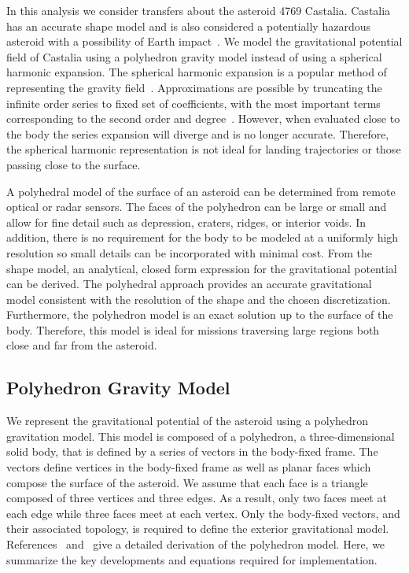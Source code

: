 \documentclass[]{aiaa-tc}%
\begin{document}
In this analysis we consider transfers about the asteroid 4769 Castalia.
Castalia has an accurate shape model and is also considered a potentially hazardous asteroid with a possibility of Earth impact~\cite{hudson1994}.
We model the gravitational potential field of Castalia using a polyhedron gravity model instead of using a spherical harmonic expansion.
The spherical harmonic expansion is a popular method of representing the gravity field~\cite{scheeres1996}.
Approximations are possible by truncating the infinite order series to fixed set of coefficients, with the most important terms corresponding to the second order and degree~\cite{scheeres1994}. 
However, when evaluated close to the body the series expansion will diverge and is no longer accurate. 
Therefore, the spherical harmonic representation is not ideal for landing trajectories or those passing close to the surface.

A polyhedral model of the surface of an asteroid can be determined from remote optical or radar sensors.
The faces of the polyhedron can be large or small and allow for fine detail such as depression, craters, ridges, or interior voids.
In addition, there is no requirement for the body to be modeled at a uniformly high resolution so small details can be incorporated with minimal cost.
From the shape model, an analytical, closed form expression for the gravitational potential can be derived.
The polyhedral approach provides an accurate gravitational model consistent with the resolution of the shape and the chosen discretization.
Furthermore, the polyhedron model is an exact solution up to the surface of the body.
Therefore, this model is ideal for missions traversing large regions both close and far from the asteroid.

\subsection{Polyhedron Gravity Model}\label{sec:polyhedron_model}

We represent the gravitational potential of the asteroid using a polyhedron gravitation model.
This model is composed of a polyhedron, a three-dimensional solid body, that is defined by a series of vectors in the body-fixed frame.
The vectors define vertices in the body-fixed frame as well as planar faces which compose the surface of the asteroid.
We assume that each face is a triangle composed of three vertices and three edges.
As a result, only two faces meet at each edge while three faces meet at each vertex.
Only the body-fixed vectors, and their associated topology, is required to define the exterior gravitational model.
References~ and~ give a detailed derivation of the polyhedron model.
Here, we summarize the key developments and equations required for implementation.
\end{document}
